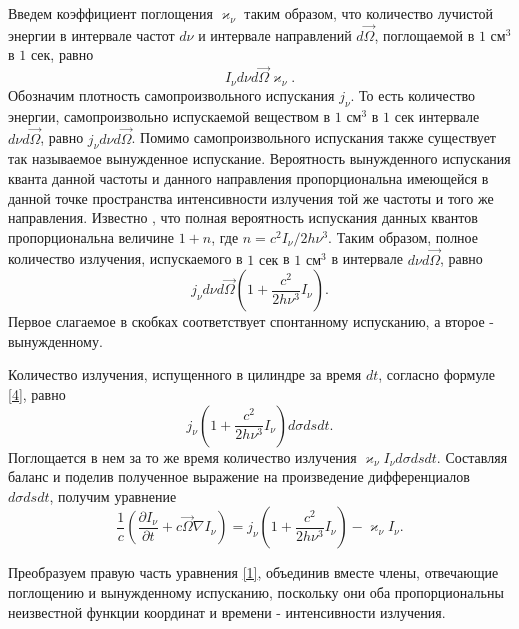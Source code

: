 Введем коэффициент поглощения $\varkappa_\nu$ таким образом, что количество лучистой энергии в интервале частот $d\nu$ и интервале направлений $d\vec\Omega$, поглощаемой в $1 \text{ см}^3$ в  $1 \text{ сек}$, равно
\begin {equation}
I_{\nu}d\nu d\vec\Omega \varkappa_{\nu}.
\label {3}
\end {equation}
Обозначим плотность самопроизвольного испускания $j_\nu$. То есть количество энергии, самопроизвольно испускаемой веществом  в $1 \text{ см}^3$ в  $1 \text{ сек}$ интервале $d\nu d\vec\Omega$, равно $j_{\nu}d\nu d\vec\Omega$. Помимо самопроизвольного испускания также существует так называемое вынужденное испускание. Вероятность вынужденного испускания кванта данной частоты и данного направления пропорциональна имеющейся в данной точке пространства интенсивности излучения той же частоты и того же направления. Известно \cite{zeld_2013}, что полная вероятность испускания данных квантов пропорциональна величине $1+n$, где $n = c^2I_{\nu}/2h\nu^3$. Таким образом, полное количество излучения, испускаемого в $1 \text{ сек}$ в $1 \text{ см}^3$ в интервале $d\nu d\vec\Omega$, равно 
\begin {equation}
j_{\nu} d\nu d\vec\Omega \left(1+\frac{c^2}{2h\nu^3}I_{\nu}\right).
\label{4}
\end {equation}
Первое слагаемое в скобках соответствует спонтанному испусканию, а второе - вынужденному. 

Количество излучения, испущенного в цилиндре за время $dt$, согласно формуле \eqref{4}, равно
\begin {equation}
j_{\nu}\left(1 + \frac {c^2}{2h\nu^3}I_{\nu}\right)d\sigma ds dt.
\end {equation}
Поглощается в нем за то же время количество излучения $\varkappa_{\nu} I_{\nu}d\sigma dsdt$. Составляя баланс и поделив полученное выражение на произведение дифференциалов $d\sigma dsdt$, получим уравнение
\begin {equation}
\frac{1}{c} \left(\frac{\partial I_{\nu}}{\partial t} + c \vec \Omega \nabla I_{\nu}\right) = j_{\nu} \left(1 + \frac {c^2}{2h\nu^3}I_{\nu}\right) - \varkappa_{\nu}I_{\nu}.
\label{1}
\end {equation}

Преобразуем правую часть уравнения \eqref{1}, объединив вместе члены, отвечающие поглощению и вынужденному испусканию, поскольку они оба пропорциональны неизвестной функции координат и времени - интенсивности излучения. 

